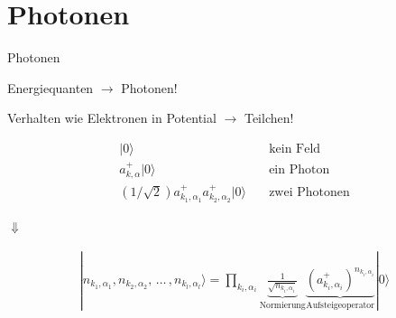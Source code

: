 \documentclass{beamer}
\begin{document}
\section{Photonen}
\begin{frame}[t]{Photonen}
	\vspace*{-0.5cm}
	\begin{center}
		Energiequanten $\rightarrow$ Photonen!
		
		Verhalten wie Elektronen in Potential $\rightarrow$ Teilchen!
		
		\begin{minipage}{0.35\textwidth}
			\begin{align*}
			|0\rangle & \quad \text{kein Feld}\\
			a^+_{k,\alpha}|0\rangle & \quad \text{ein Photon}\\
			\left(1/\sqrt{2}\right)a^+_{k_1,\alpha_1}a^+_{k_2,\alpha_2}|0\rangle & \quad \text{zwei Photonen}
			\end{align*}
		\end{minipage}
		
		\vspace*{0.5cm}
		$\Downarrow$
		
		\begin{minipage}{0.35\textwidth}
			\begin{align*}
			|n_{k_1,\alpha_1}, n_{k_2,\alpha_2}, \, \hdots \, , n_{k_l,\alpha_l}\rangle =
			\prod_{k_i,\alpha_i}\underbrace{\frac{1}{\sqrt{n_{k_i,\alpha_i}}}}_{\text{Normierung}} \underbrace{\left(a^+_{k_i,\alpha_i}\right)^{n_{k_i,\alpha_i}}}_{\text{Aufsteigeoperator}} |0\rangle
			\end{align*}
		\end{minipage}
	\end{center}
\end{frame}
\end{document}
